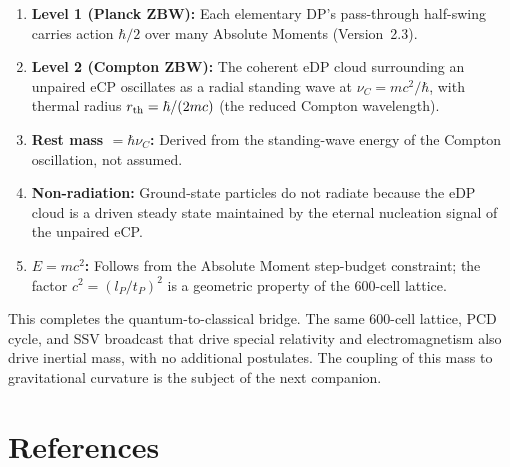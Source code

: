 \documentclass[12pt]{article}
\newcommand{\lP}{l_P}
\newcommand{\tP}{t_P}
\newcommand{\nuC}{\nu_C}
\begin{document}
\begin{enumerate}
  \item \textbf{Level 1 (Planck ZBW):} Each elementary DP's pass-through
    half-swing carries action $\hbar/2$ over many Absolute Moments
    (Version~2.3).

  \item \textbf{Level 2 (Compton ZBW):} The coherent eDP cloud surrounding
    an unpaired eCP oscillates as a radial standing wave at $\nuC =
    mc^2/\hbar$, with thermal radius $r_{\rm th} = \hbar/(2mc)$
    (the reduced Compton wavelength).

  \item \textbf{Rest mass $= \hbar\nuC$:} Derived from the standing-wave
    energy of the Compton oscillation, not assumed.

  \item \textbf{Non-radiation:} Ground-state particles do not radiate
    because the eDP cloud is a driven steady state maintained by the
    eternal nucleation signal of the unpaired eCP.

  \item \textbf{$E = mc^2$:} Follows from the Absolute Moment step-budget
    constraint; the factor $c^2 = (\lP/\tP)^2$ is a geometric property
    of the 600-cell lattice.
\end{enumerate}

This completes the quantum-to-classical bridge.  The same 600-cell lattice,
PCD cycle, and SSV broadcast that drive special relativity and
electromagnetism also drive inertial mass, with no additional postulates.
The coupling of this mass to gravitational curvature is the subject of the
next companion.

\section*{References}
\end{document}
